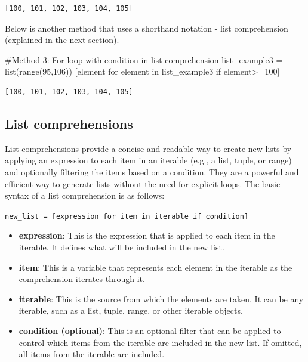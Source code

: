 \documentclass[
  letterpaper,
  DIV=11,
  numbers=noendperiod]{scrreprt}
\newenvironment{Shaded}{\begin{snugshade}}{\end{snugshade}}
\newcommand{\BuiltInTok}[1]{\textcolor[rgb]{0.00,0.23,0.31}{#1}}
\newcommand{\CommentTok}[1]{\textcolor[rgb]{0.37,0.37,0.37}{#1}}
\newcommand{\ControlFlowTok}[1]{\textcolor[rgb]{0.00,0.23,0.31}{#1}}
\newcommand{\DecValTok}[1]{\textcolor[rgb]{0.68,0.00,0.00}{#1}}
\newcommand{\KeywordTok}[1]{\textcolor[rgb]{0.00,0.23,0.31}{#1}}
\newcommand{\NormalTok}[1]{\textcolor[rgb]{0.00,0.23,0.31}{#1}}
\newcommand{\OperatorTok}[1]{\textcolor[rgb]{0.37,0.37,0.37}{#1}}
\begin{document}
\begin{verbatim}
[100, 101, 102, 103, 104, 105]
\end{verbatim}

Below is another method that uses a shorthand notation - list
comprehension (explained in the next section).

\begin{Shaded}
\begin{Highlighting}[]
\CommentTok{\#Method 3: For loop with condition in list comprehension}
\NormalTok{list\_example3 }\OperatorTok{=} \BuiltInTok{list}\NormalTok{(}\BuiltInTok{range}\NormalTok{(}\DecValTok{95}\NormalTok{,}\DecValTok{106}\NormalTok{))}
\NormalTok{[element }\ControlFlowTok{for}\NormalTok{ element }\KeywordTok{in}\NormalTok{ list\_example3 }\ControlFlowTok{if}\NormalTok{ element}\OperatorTok{\textgreater{}=}\DecValTok{100}\NormalTok{]}
\end{Highlighting}
\end{Shaded}

\begin{verbatim}
[100, 101, 102, 103, 104, 105]
\end{verbatim}

\hypertarget{list-comprehensions}{%
\subsection{List comprehensions}\label{list-comprehensions}}

List comprehensions provide a concise and readable way to create new
lists by applying an expression to each item in an iterable (e.g., a
list, tuple, or range) and optionally filtering the items based on a
condition. They are a powerful and efficient way to generate lists
without the need for explicit loops. The basic syntax of a list
comprehension is as follows:

\texttt{new\_list\ =\ {[}expression\ for\ item\ in\ iterable\ if\ condition{]}}

\begin{itemize}
\item
  \textbf{expression}: This is the expression that is applied to each
  item in the iterable. It defines what will be included in the new
  list.
\item
  \textbf{item}: This is a variable that represents each element in the
  iterable as the comprehension iterates through it.
\item
  \textbf{iterable}: This is the source from which the elements are
  taken. It can be any iterable, such as a list, tuple, range, or other
  iterable objects.
\item
  \textbf{condition (optional)}: This is an optional filter that can be
  applied to control which items from the iterable are included in the
  new list. If omitted, all items from the iterable are included.
\end{itemize}
\end{document}
